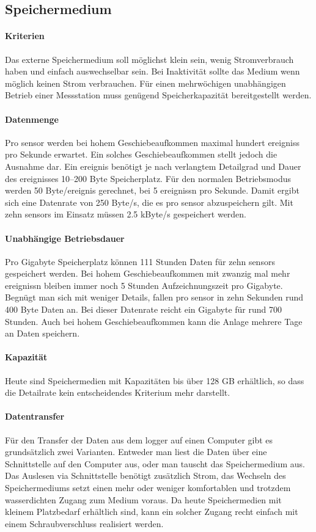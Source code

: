 \subsection{Speichermedium}
\paragraph{Kriterien} Das externe Speichermedium soll möglichst klein sein, wenig Stromverbrauch haben und einfach auswechselbar sein. Bei Inaktivität sollte das Medium wenn möglich keinen Strom verbrauchen. Für einen mehrwöchigen unabhängigen Betrieb einer Messstation muss genügend Speicherkapazität bereitgestellt werden.

\paragraph{Datenmenge} Pro \gls{sensor} werden bei hohem Geschiebeaufkommen maximal hundert \glspl{ereignis} pro Sekunde erwartet. Ein solches Geschiebeaufkommen stellt jedoch die Ausnahme dar. Ein \gls{ereignis} benötigt je nach verlangtem Detailgrad und Dauer des \gls{ereignis}ses 10--200 Byte Speicherplatz. Für den normalen Betriebsmodus werden 50 Byte/\gls{ereignis} gerechnet, bei 5 \glspl{ereignis}n pro Sekunde. Damit ergibt sich eine Datenrate von 250 Byte/s, die es pro \gls{sensor} abzuspeichern gilt. Mit zehn \glspl{sensor} im Einsatz müssen 2.5 kByte/s gespeichert werden. 

\paragraph{Unabhängige Betriebsdauer} Pro Gigabyte Speicherplatz können 111 Stunden Daten für zehn \glspl{sensor} gespeichert werden. Bei hohem Geschiebeaufkommen mit zwanzig mal mehr \glspl{ereignis}n bleiben immer noch 5 Stunden Aufzeichnungszeit pro Gigabyte. Begnügt man sich mit weniger Details, fallen pro \gls{sensor} in zehn Sekunden rund 400 Byte Daten an. Bei dieser Datenrate reicht ein Gigabyte für rund 700 Stunden. Auch bei hohem Geschiebeaufkommen kann die Anlage mehrere Tage an Daten speichern. 

\paragraph{Kapazität} Heute sind Speichermedien mit Kapazitäten bis über 128 GB erhältlich, so dass die Detailrate kein entscheidendes Kriterium mehr darstellt.

\paragraph{Datentransfer} Für den Transfer der Daten aus dem \gls{logger} auf einen Computer gibt es grundsätzlich zwei Varianten. Entweder man liest die Daten über eine Schnittstelle auf den Computer aus, oder man tauscht das Speichermedium aus. Das Auslesen via Schnittstelle benötigt zusätzlich Strom, das Wechseln des Speichermediums setzt einen mehr oder weniger komfortablen und trotzdem wasserdichten Zugang zum Medium voraus. Da heute Speichermedien mit kleinem Platzbedarf erhältlich sind, kann ein solcher Zugang recht einfach mit einem Schraubverschluss realisiert werden.

